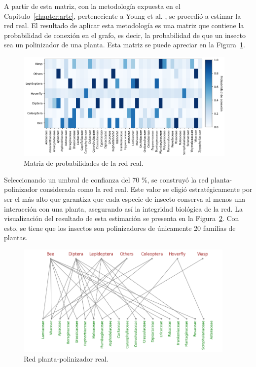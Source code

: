 A partir de esta matriz, con la metodología expuesta en el Capítulo~\ref{chapter:arte}, perteneciente a Young et al. \cite{young-2021}, se procedió a estimar la red real. El resultado de aplicar esta metodología es una matriz que contiene la probabilidad de conexión en el grafo, es decir, la probabilidad de que un insecto sea un polinizador de una planta. Esta matriz se puede apreciar en la Figura~\ref{fig:matriz_probabilidades_real}. 

\begin{figure}[H]
    \centering
    \includegraphics[width=0.96\textwidth]{Figuras/matriz_probabilidades_real.png}
    \caption{Matriz de probabilidades de la red real.}
    \label{fig:matriz_probabilidades_real}
\end{figure}

Seleccionando un umbral de confianza del 70 \%, se construyó la red planta-polinizador considerada como la red real. Este valor se eligió estratégicamente por ser el más alto que garantiza que cada especie de insecto conserva al menos una interacción con una planta, asegurando así la integridad biológica de la red. La visualización del resultado de esta estimación se presenta en la Figura~\ref{fig:red_real}. Con esto, se tiene que los insectos son polinizadores de únicamente 20 familias de plantas.

\begin{figure}[H]
    \centering
    \includegraphics[width=0.95\textwidth]{Figuras/red_real.png}
    \caption{Red planta-polinizador real.}
    \label{fig:red_real}
\end{figure}


